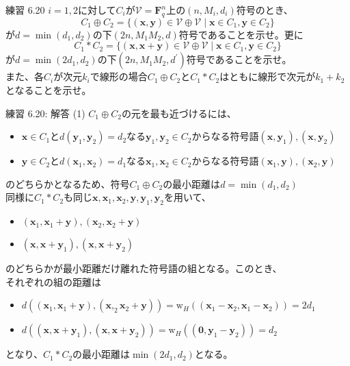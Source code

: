 \documentclass[dvipdfmx,10pt,jsarticle]{beamer}
\begin{document}
  \begin{frame}{練習 6.20}
    $i = 1, 2$に対して$C_i$が$\mathcal{V} = \mathbf{F}_q^n$上の$(n, M_i, d_i)$符号のとき、
    \[ C_1 \oplus C_2 = \lbrace(\mathbf{x} , \mathbf{y}) \in \mathcal{V} \oplus \mathcal{V} \mid \mathbf{x} \in C_1, \mathbf{y} \in C_2 \rbrace \]
    が$d = \min (d_1, d_2)$の下$(2n, M_1M_2, d)$符号であることを示せ。更に
    \[ C_1 \ast C_2 = \lbrace(\mathbf{x} , \mathbf{x} + \mathbf{y}) \in \mathcal{V} \oplus \mathcal{V} \mid \mathbf{x} \in C_1, \mathbf{y} \in C_2 \rbrace \]
    が$d = \min (2d_1, d_2)$の下$(2n, M_1M_2, d^\prime)$符号であることを示せ。\\
    また、各$C_i$が次元$k_i$で線形の場合$C_1 \oplus C_2$と$C_1 \ast C_2$はともに線形で次元が$k_1 + k_2$となることを示せ。
  \end{frame}
  \begin{frame}{練習 6.20: 解答 (1)}
    $C_1 \oplus C_2$の元を最も近づけるには、
    \begin{itemize}
      \item $\mathbf{x} \in C_1$と$d(\mathbf{y}_1, \mathbf{y}_2) = d_2$なる$\mathbf{y}_1, \mathbf{y}_2 \in C_2$からなる符号語$(\mathbf{x}, \mathbf{y}_1), (\mathbf{x}, \mathbf{y}_2)$
      \item $\mathbf{y} \in C_2$と$d(\mathbf{x}_1, \mathbf{x}_2) = d_1$なる$\mathbf{x}_1, \mathbf{x}_2 \in C_2$からなる符号語$(\mathbf{x}_1, \mathbf{y}), (\mathbf{x}_2, \mathbf{y})$
    \end{itemize}
    のどちらかとなるため、符号$C_1 \oplus C_2$の最小距離は$d = \min(d_1, d_2)$ \\
    同様に$C_1 \ast C_2$も同じ$\mathbf{x}, \mathbf{x}_1, \mathbf{x}_2, \mathbf{y}, \mathbf{y}_1, \mathbf{y}_2$を用いて、\\
    \begin{itemize}
      \item $(\mathbf{x}_1, \mathbf{x}_1 + \mathbf{y}), (\mathbf{x}_2, \mathbf{x}_2 + \mathbf{y})$
      \item $(\mathbf{x}, \mathbf{x} + \mathbf{y}_1), (\mathbf{x}, \mathbf{x} + \mathbf{y}_2)$
    \end{itemize}
    のどちらかが最小距離だけ離れた符号語の組となる。このとき、\\
    それぞれの組の距離は
    \begin{itemize}
      \item $d((\mathbf{x}_1, \mathbf{x}_1 + \mathbf{y}), (\mathbf{x},_2 \mathbf{x}_2 + \mathbf{y})) = \text{w}_H((\mathbf{x}_1 - \mathbf{x}_2, \mathbf{x}_1 - \mathbf{x}_2)) = 2d_1$
      \item $d((\mathbf{x}, \mathbf{x} + \mathbf{y}_1), (\mathbf{x}, \mathbf{x} + \mathbf{y}_2)) = \text{w}_H((\mathbf{0}, \mathbf{y}_1 - \mathbf{y}_2)) = d_2$
    \end{itemize}
    となり、$C_1 \ast C_2$の最小距離は$\min(2d_1, d_2)$となる。
  \end{frame}
\end{document}
